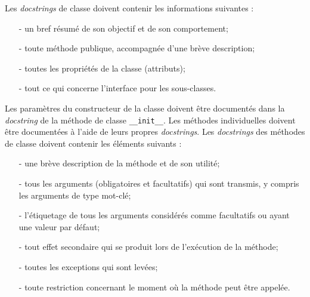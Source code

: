 \documentclass[a4paper,11pt]{book}
\begin{document}
Les \textit{docstrings} de classe doivent contenir les informations suivantes :
\begin{itemize}
	\item[-] un bref résumé de son objectif et de son comportement;
	\item[-] toute méthode publique, accompagnée d'une brève description;
	\item[-] toutes les propriétés de la classe (attributs);
	\item[-] tout ce qui concerne l'interface pour les sous-classes.
\end{itemize}
\medskip

Les paramètres du constructeur de la classe doivent être documentés dans la \textit{docstring} de la méthode de classe \texttt{\_\_init\_\_}. Les méthodes individuelles doivent être documentées à l'aide de leurs propres \textit{docstrings}. Les \textit{docstrings} des méthodes de classe doivent contenir les éléments suivants :
\begin{itemize}
	\item[-] une brève description de la méthode et de son utilité;
	\item[-] tous les arguments (obligatoires et facultatifs) qui sont transmis, y compris les arguments de type mot-clé;
	\item[-] l'étiquetage de tous les arguments considérés comme facultatifs ou ayant une valeur par défaut;
	\item[-] tout effet secondaire qui se produit lors de l'exécution de la méthode;
	\item[-] toutes les exceptions qui sont levées;
	\item[-] toute restriction concernant le moment où la méthode peut être appelée.
\end{itemize}
\medskip
\end{document}
